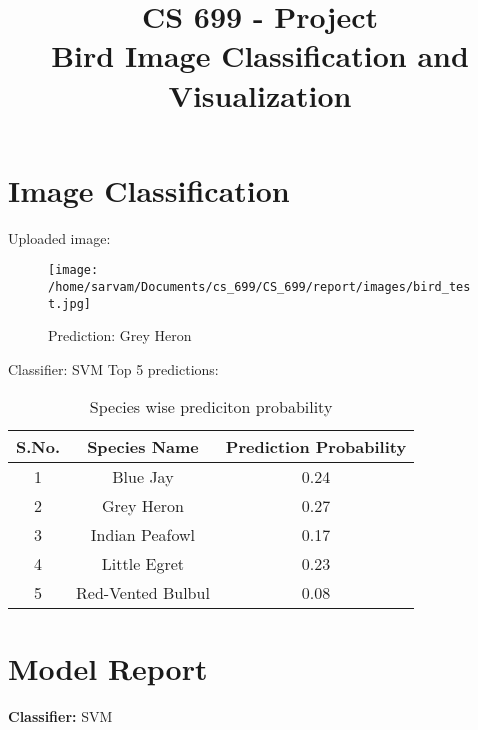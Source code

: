 \documentclass{article}
\date{}
\title{CS 699 - Project\\ Bird Image Classification and Visualization}
\begin{document}
\maketitle

\section{Image Classification}

\noindent Uploaded image:

\begin{figure}[h!]
\centering
\texttt{[image: /home/sarvam/Documents/cs\_699/CS\_699/report/images/bird\_test.jpg]}
\caption*{Prediction: Grey Heron}
\label{fig:method}
\end{figure}

\noindent Classifier: SVM
\newline
\newline
\newline
\noindent Top 5 predictions:
\newline
\begin{table}[h!]
\centering
\begin{tabular}{|c|c|c|} 
\hline
 S.No. & Species Name & Prediction Probability\\ 
\hline
 1 & Blue Jay & 0.24 \\ 
 \hline
 2 & Grey Heron & 0.27 \\  
 \hline
 3 & Indian Peafowl & 0.17 \\    
 \hline
 4 & Little Egret & 0.23 \\    
 \hline
 5 & Red-Vented Bulbul & 0.08 \\    
 \hline
\end{tabular}
\caption{Species wise prediciton probability}
\label{table:data}
\end{table}




\newpage
\section{Model Report}

\textbf{Classifier:} SVM
\newline
\end{document}

